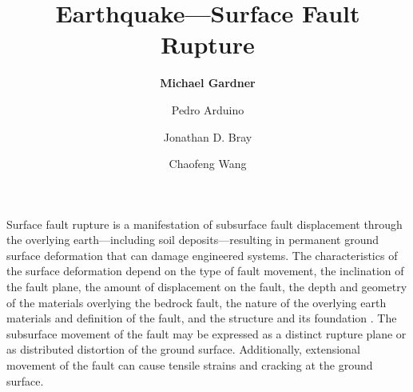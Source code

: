 %
%
%


%
%
%
%
%
%
%
%

\title{Earthquake---Surface Fault Rupture}
\author{
    \textbf{Michael Gardner } 
    \and Pedro Arduino
    \and Jonathan D. Bray
    \and Chaofeng Wang}
\tocauthor{}
%
%
\maketitle

Surface fault rupture is a manifestation of subsurface fault displacement through the overlying earth---including soil deposits---resulting in permanent ground surface deformation that can damage engineered systems. The characteristics of the surface deformation depend on the type of fault movement, the inclination of the fault plane, the amount of displacement on the fault, the depth and geometry of the materials overlying the bedrock fault, the nature of the overlying earth materials and definition of the fault, and the structure and its foundation \citep{bray2001developing}. The subsurface movement of the fault may be expressed as a distinct rupture plane or as distributed distortion of the ground surface. Additionally, extensional movement of the fault can cause tensile strains and cracking at the ground surface.


